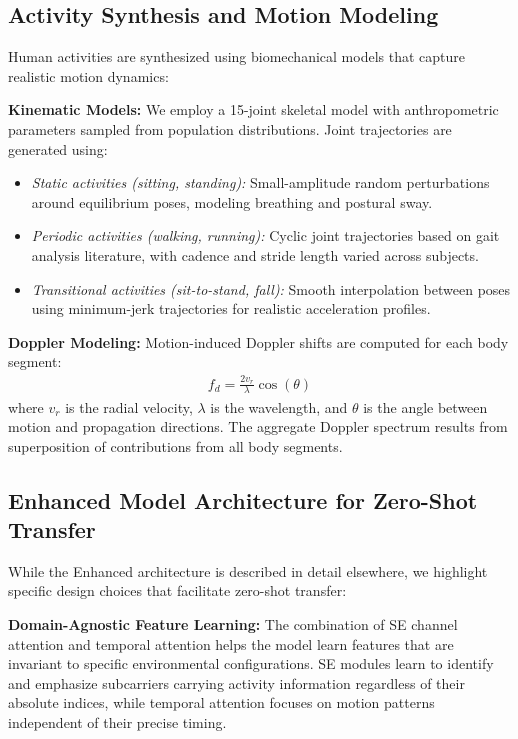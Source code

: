 \documentclass[journal]{IEEEtran}
\begin{document}
\subsection{Activity Synthesis and Motion Modeling}
Human activities are synthesized using biomechanical models that capture realistic motion dynamics:

\textbf{Kinematic Models:} We employ a 15-joint skeletal model with anthropometric parameters sampled from population distributions. Joint trajectories are generated using:
\begin{itemize}
\item \textit{Static activities (sitting, standing):} Small-amplitude random perturbations around equilibrium poses, modeling breathing and postural sway.
\item \textit{Periodic activities (walking, running):} Cyclic joint trajectories based on gait analysis literature, with cadence and stride length varied across subjects.
\item \textit{Transitional activities (sit-to-stand, fall):} Smooth interpolation between poses using minimum-jerk trajectories for realistic acceleration profiles.
\end{itemize}

\textbf{Doppler Modeling:} Motion-induced Doppler shifts are computed for each body segment:
\begin{align}
f_d = \frac{2v_r}{\lambda} \cos(\theta)
\end{align}
where $v_r$ is the radial velocity, $\lambda$ is the wavelength, and $\theta$ is the angle between motion and propagation directions. The aggregate Doppler spectrum results from superposition of contributions from all body segments.

\subsection{Enhanced Model Architecture for Zero-Shot Transfer}
While the Enhanced architecture is described in detail elsewhere, we highlight specific design choices that facilitate zero-shot transfer:

\textbf{Domain-Agnostic Feature Learning:} The combination of SE channel attention and temporal attention helps the model learn features that are invariant to specific environmental configurations. SE modules learn to identify and emphasize subcarriers carrying activity information regardless of their absolute indices, while temporal attention focuses on motion patterns independent of their precise timing.
\end{document}
